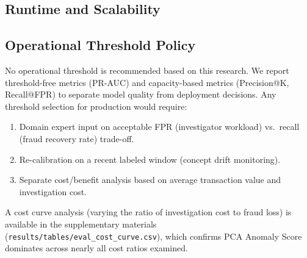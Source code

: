 \subsection{Runtime and Scalability}
\label{sec:p2_runtime}

\begin{table}[t]
\centering
\caption{Training and Inference Runtime (CPU, Apple Silicon). AE/DAE trained for 100 epochs; PCA/GMM/etc. include sweep time.}
\label{tab:p2_runtime}
\footnotesize
{}
\end{table}

\subsection{Operational Threshold Policy}
\label{sec:p2_threshold}

No operational threshold is recommended based on this research. We report threshold-free metrics (PR-AUC) and capacity-based metrics (Precision@K, Recall@FPR) to separate model quality from deployment decisions. Any threshold selection for production would require:
\begin{enumerate}
  \item Domain expert input on acceptable FPR (investigator workload) vs.\ recall (fraud recovery rate) trade-off.
  \item Re-calibration on a recent labeled window (concept drift monitoring).
  \item Separate cost/benefit analysis based on average transaction value and investigation cost.
\end{enumerate}

A cost curve analysis (varying the ratio of investigation cost to fraud loss) is available in the supplementary materials (\texttt{results/tables/eval\_cost\_curve.csv}), which confirms PCA Anomaly Score dominates across nearly all cost ratios examined.
